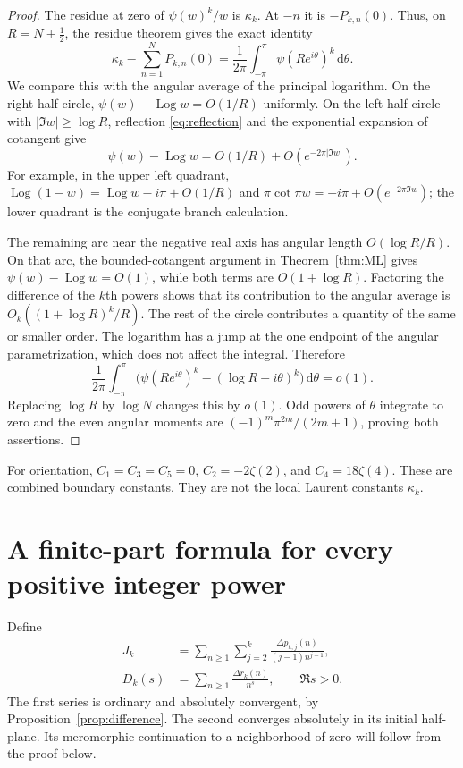 \documentclass[11pt,a4paper]{article}
\numberwithin{equation}{section}
\theoremstyle{definition}
\theoremstyle{remark}
\newcommand{\dd}{\mathrm d}
\newcommand{\Log}{\operatorname{Log}}
\begin{document}
\begin{proof}
The residue at zero of $\psi(w)^k/w$ is $\kappa_k$.  At $-n$ it is
$-P_{k,n}(0)$.  Thus, on $R=N+\tfrac12$, the residue theorem gives
the exact identity
\begin{equation}
 \kappa_k-\sum_{n=1}^N P_{k,n}(0)
       =\frac1{2\pi}\int_{-\pi}^{\pi}
                           \psi(Re^{i\theta})^k\,\dd\theta.
 \label{eq:exact-circle}
\end{equation}
We compare this with the angular average of the principal logarithm.
On the right half-circle, $\psi(w)-\Log w=O(1/R)$ uniformly.
On the left half-circle with $|\Im w|\ge\log R$, reflection
\eqref{eq:reflection} and the exponential expansion of cotangent give
\[
 \psi(w)-\Log w=O(1/R)+O(e^{-2\pi|\Im w|}).
\]
For example, in the upper left quadrant,
$\Log(1-w)=\Log w-i\pi+O(1/R)$ and
$\pi\cot\pi w=-i\pi+O(e^{-2\pi\Im w})$; the lower quadrant is
the conjugate branch calculation.

The remaining arc near the negative real axis has angular length
$O(\log R/R)$.  On that arc, the bounded-cotangent argument in
Theorem~\ref{thm:ML} gives $\psi(w)-\Log w=O(1)$, while both
terms are $O(1+\log R)$.  Factoring the difference of the $k$th
powers shows that its contribution to the angular average is
$O_k((1+\log R)^k/R)$.  The rest of the circle contributes a quantity
of the same or smaller order.  The logarithm has a jump at the one
endpoint of the angular parametrization, which does not affect the
integral.  Therefore
\[
 \frac1{2\pi}\int_{-\pi}^{\pi}
   \bigl(\psi(Re^{i\theta})^k-(\log R+i\theta)^k\bigr)
                                      \,\dd\theta=o(1).
\]
Replacing $\log R$ by $\log N$ changes this by $o(1)$.  Odd powers
of $\theta$ integrate to zero and the even angular moments are
$(-1)^m\pi^{2m}/(2m+1)$, proving both assertions.
\end{proof}

For orientation, $C_1=C_3=C_5=0$, $C_2=-2\zeta(2)$, and
$C_4=18\zeta(4)$.  These are combined boundary constants.  They are
not the local Laurent constants $\kappa_k$.

\section{A finite-part formula for every positive integer power}
\label{sec:bridge}

Define
\begin{align}
 J_k&=\sum_{n\ge1}\sum_{j=2}^k
          \frac{\Delta p_{k,j}(n)}{(j-1)n^{j-1}},
 \label{eq:Jdef}\\
 D_k(s)&=\sum_{n\ge1}\frac{\Delta r_k(n)}{n^s},
                       \qquad \Re s>0.
 \label{eq:Ddef}
\end{align}
The first series is ordinary and absolutely convergent, by
Proposition~\ref{prop:difference}.  The second converges absolutely
in its initial half-plane.  Its meromorphic continuation to a
neighborhood of zero will follow from the proof below.
\end{document}
